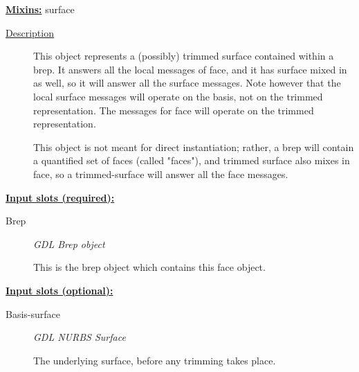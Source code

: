 \documentclass [11pt]{book}
\begin{document}
\begin{itemize}
\textbf{
\underline{Mixins:}} surface





\begin{description}

\item [
\underline{Description}]


This object represents a (possibly) trimmed surface contained within a brep. It answers
all the local messages of face, and it has surface mixed in as well, so it will answer all the surface messages. Note 
however that the local surface messages will operate on the basis, not on the trimmed representation. The messages 
for face will operate on the trimmed representation.

This object is not meant for direct instantiation; rather, a brep will contain a quantified set of faces (called "faces"),
and trimmed surface also mixes in face, so a trimmed-surface will answer all the face messages.



\end{description}








\textbf{
\underline{Input slots (required):}}

\begin{description}

\item [Brep]
\emph{GDL Brep object}

 This is the brep object which contains this face object.




\end{description}






\textbf{
\underline{Input slots (optional):}}

\begin{description}

\item [Basis-surface]
\emph{GDL NURBS Surface}

 The underlying surface, before any trimming takes place.




\end{description}







\end{itemize}
\end{document}
